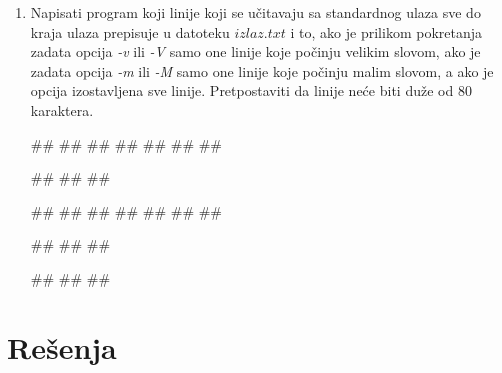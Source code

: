 \begin{enumerate}
\item Napisati program koji linije koji se učitavaju sa standardnog ulaza sve do kraja ulaza prepisuje u datoteku $izlaz.txt$ i to, ako je prilikom pokretanja zadata opcija \textit{-v} ili \textit{-V} samo one linije koje počinju velikim slovom, ako je zadata opcija \textit{-m} ili \textit{-M} samo one linije koje počinju malim slovom, a ako je opcija izostavljena sve linije. Pretpostaviti da linije neće biti duže od 80 karaktera. \\
\begin{miditest}
\begin{upotreba}{1}
##
#\naslovInt#
##
##
##
##
##

##
##
##
\end{upotreba}
\end{miditest}
\begin{miditest}
\begin{upotreba}{2}
##
#\naslovInt#
##
##
##
##
##

##
##
##
\end{upotreba}
\end{miditest}

\begin{miditest}
\begin{upotreba}{3}
##
#\naslovInt#
##
\end{upotreba}
\end{miditest}



\end{enumerate}




\section{Rešenja}
\shipoutAnswer
